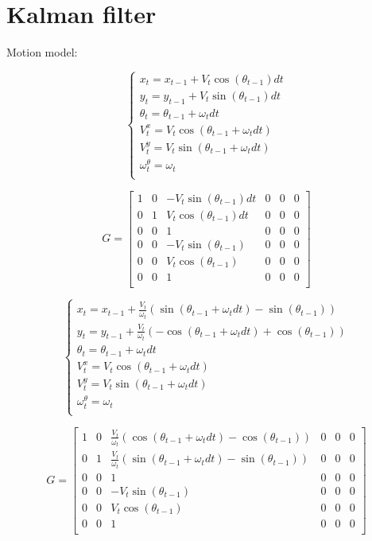 \documentclass[12pt]{article}
\begin{document}
\section*{Kalman filter}

Motion model:

\[
\left\{\begin{array}{lcl}
    x_t=x_{t-1}+V_t\cos(\theta_{t-1})dt \\
    y_t=y_{t-1}+V_t\sin(\theta_{t-1})dt \\
    \theta_t=\theta_{t-1} + \omega_t dt \\
    V_t^x=V_t\cos(\theta_{t-1} + \omega_t dt) \\
    V_t^y=V_t\sin(\theta_{t-1} + \omega_t dt) \\
    \omega_t^\theta = \omega_t \\
\end{array}
\right.
\]

\[
G=
 \begin{bmatrix}
  1 & 0 & -V_t\sin(\theta_{t-1})dt & 0 & 0 & 0\\
  0 & 1 & V_t\cos(\theta_{t-1})dt & 0 & 0 & 0\\
  0 & 0 & 1 & 0 & 0 & 0\\
  0 & 0 & -V_t\sin(\theta_{t-1}) & 0 & 0 & 0\\
  0 & 0 & V_t\cos(\theta_{t-1}) & 0 & 0 & 0\\
  0 & 0 & 1 & 0 & 0 & 0\\
 \end{bmatrix}
\]

\[
\left\{\begin{array}{lcl}
    x_t=x_{t-1}+\frac{V_t}{\omega_t}\left(\sin(\theta_{t-1} + \omega_tdt) - \sin(\theta_{t-1})\right)\\
    y_t=y_{t-1}+\frac{V_t}{\omega_t}\left(-\cos(\theta_{t-1} + \omega_tdt) + \cos(\theta_{t-1})\right) \\
    \theta_t=\theta_{t-1} + \omega_t dt \\
    V_t^x=V_t\cos(\theta_{t-1} + \omega_t dt) \\
    V_t^y=V_t\sin(\theta_{t-1} + \omega_t dt) \\
    \omega_t^\theta = \omega_t \\
\end{array}
\right.
\]

\[
G=
 \begin{bmatrix}
  1 & 0 & \frac{V_t}{\omega_t}\left(\cos(\theta_{t-1} + \omega_tdt) - \cos(\theta_{t-1})\right) & 0 & 0 & 0\\
  0 & 1 & \frac{V_t}{\omega_t}\left(\sin(\theta_{t-1} + \omega_tdt) - \sin(\theta_{t-1})\right) & 0 & 0 & 0\\
  0 & 0 & 1 & 0 & 0 & 0\\
  0 & 0 & -V_t\sin(\theta_{t-1}) & 0 & 0 & 0\\
  0 & 0 & V_t\cos(\theta_{t-1}) & 0 & 0 & 0\\
  0 & 0 & 1 & 0 & 0 & 0\\
 \end{bmatrix}
\]
\end{document}
